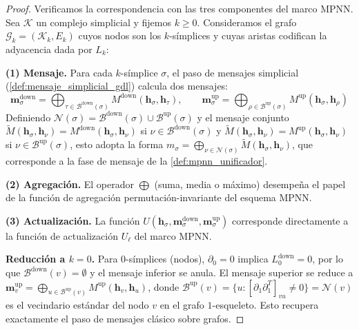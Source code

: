 \begin{proof}
Verificamos la correspondencia con las tres componentes del marco \gls{MPNN}. Sea $\mathcal{K}$ un complejo simplicial y fijemos $k \geq 0$. Consideramos el grafo $\mathcal{G}_k = (\mathcal{K}_k, E_k)$ cuyos nodos son los $k$-símplices y cuyas aristas codifican la adyacencia dada por $L_k$:

\textbf{(1) Mensaje.} Para cada $k$-símplice $\sigma$, el paso de mensajes simplicial (\autoref{def:mensaje_simplicial_gdl}) calcula dos mensajes:
\[
\mathbf{m}_\sigma^{\mathrm{down}} = \bigoplus_{\tau \in \mathcal{B}^{\mathrm{down}}(\sigma)} M^{\mathrm{down}}(\mathbf{h}_\sigma, \mathbf{h}_\tau), \qquad
\mathbf{m}_\sigma^{\mathrm{up}} = \bigoplus_{\rho \in \mathcal{B}^{\mathrm{up}}(\sigma)} M^{\mathrm{up}}(\mathbf{h}_\sigma, \mathbf{h}_\rho)
\]
Definiendo $\mathcal{N}(\sigma) = \mathcal{B}^{\mathrm{down}}(\sigma) \cup \mathcal{B}^{\mathrm{up}}(\sigma)$ y el mensaje conjunto $\widetilde{M}(\mathbf{h}_\sigma, \mathbf{h}_\nu) = M^{\mathrm{down}}(\mathbf{h}_\sigma, \mathbf{h}_\nu)$ si $\nu \in \mathcal{B}^{\mathrm{down}}(\sigma)$ y $\widetilde{M}(\mathbf{h}_\sigma, \mathbf{h}_\nu) = M^{\mathrm{up}}(\mathbf{h}_\sigma, \mathbf{h}_\nu)$ si $\nu \in \mathcal{B}^{\mathrm{up}}(\sigma)$, esto adopta la forma $m_\sigma = \bigoplus_{\nu \in \mathcal{N}(\sigma)} \widetilde{M}(\mathbf{h}_\sigma, \mathbf{h}_\nu)$, que corresponde a la fase de mensaje de la \autoref{def:mpnn_unificador}.

\textbf{(2) Agregación.} El operador $\bigoplus$ (suma, media o máximo) desempeña el papel de la función de agregación permutación-invariante del esquema \gls{MPNN}.

\textbf{(3) Actualización.} La función $U(\mathbf{h}_\sigma, \mathbf{m}_\sigma^{\mathrm{down}}, \mathbf{m}_\sigma^{\mathrm{up}})$ corresponde directamente a la función de actualización $U_\ell$ del marco \gls{MPNN}.

\textbf{Reducción a $k=0$.} Para $0$-símplices (nodos), $\partial_0 = 0$ implica $L_0^{\mathrm{down}} = 0$, por lo que $\mathcal{B}^{\mathrm{down}}(v) = \emptyset$ y el mensaje inferior se anula. El mensaje superior se reduce a $\mathbf{m}_v^{\mathrm{up}} = \bigoplus_{u \in \mathcal{B}^{\mathrm{up}}(v)} M^{\mathrm{up}}(\mathbf{h}_v, \mathbf{h}_u)$, donde $\mathcal{B}^{\mathrm{up}}(v) = \{u : [\partial_1 \partial_1^T]_{vu} \neq 0\} = \mathcal{N}(v)$ es el vecindario estándar del nodo $v$ en el grafo $1$-esqueleto. Esto recupera exactamente el paso de mensajes clásico sobre grafos.
\end{proof}

